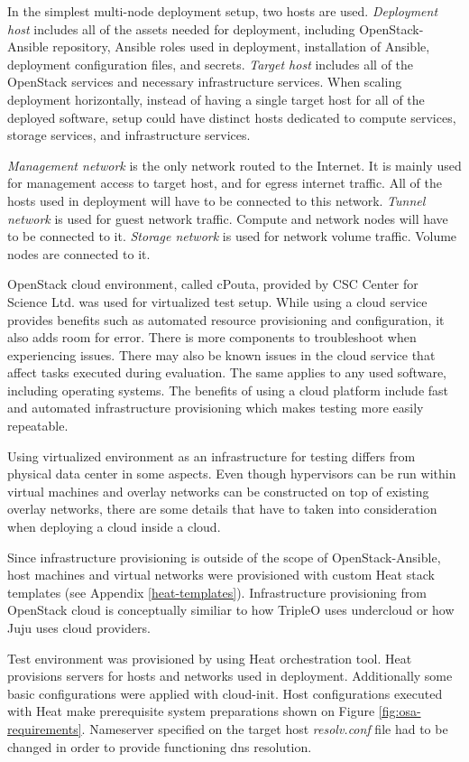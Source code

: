 In the simplest multi-node deployment setup, two hosts are used.
\textit{Deployment host} includes all of the assets needed for deployment,
including OpenStack-Ansible repository, Ansible roles used in deployment,
installation of Ansible, deployment configuration files, and secrets.
\textit{Target host} includes all of the OpenStack services and necessary
infrastructure services. When scaling deployment horizontally, instead of
having a single target host for all of the deployed software, setup could have
distinct hosts dedicated to compute services, storage services, and
infrastructure services.

\textit{Management network} is the only network routed to the Internet. It is
mainly used for management access to target host, and for egress internet
traffic. All of the hosts used in deployment will have to be connected to this
network. \textit{Tunnel network} is used for guest network traffic. Compute and
network nodes will have to be connected to it. \textit{Storage network} is used
for network volume traffic. Volume nodes are connected to it.

OpenStack cloud environment, called cPouta, provided by CSC Center for Science
Ltd. was used for virtualized test setup. While using a cloud service provides
benefits such as automated resource provisioning and configuration, it also
adds room for error. There is more components to troubleshoot when experiencing
issues. There may also be known issues in the cloud service that affect tasks
executed during evaluation. The same applies to any used software, including
operating systems. The benefits of using a cloud platform include fast and
automated infrastructure provisioning which makes testing more easily
repeatable.

Using virtualized environment as an infrastructure for testing differs from
physical data center in some aspects. Even though hypervisors can be run within
virtual machines and overlay networks can be constructed on top of existing
overlay networks, there are some details that have to taken into consideration
when deploying a cloud inside a cloud.

Since infrastructure provisioning is outside of the scope of OpenStack-Ansible,
host machines and virtual networks were provisioned with custom Heat stack
templates (see Appendix \ref{heat-templates}). Infrastructure provisioning from
OpenStack cloud is conceptually similiar to how TripleO uses undercloud or how
Juju uses cloud providers.

Test environment was provisioned by using Heat orchestration tool. Heat
provisions servers for hosts and networks used in deployment. Additionally some
basic configurations were applied with cloud-init. Host configurations executed
with Heat make prerequisite system preparations shown on Figure
\ref{fig:osa-requirements}. Nameserver specified on the target host
\textit{resolv.conf} file had to be changed in order to provide functioning dns
resolution.

